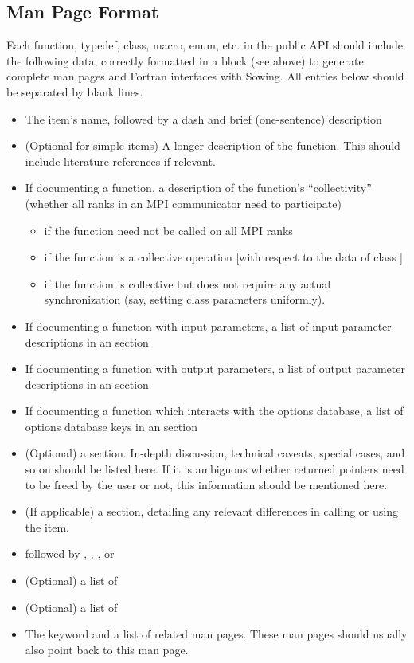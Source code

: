 \subsection{Man Page Format}
Each function, typedef, class, macro, enum, etc. in the public API should include the following data, correctly formatted in 
a block (see above) to generate complete man pages and Fortran interfaces with Sowing. 
All entries below should be separated by blank lines.
\begin{itemize}
  \item The item's name, followed by a dash and brief (one-sentence) description
  \item (Optional for simple items) A longer description of the function. This should include literature references if relevant.
  \item If documenting a function, a description of the function's ``collectivity'' (whether all ranks in an MPI communicator need to participate)
    \begin{itemize}
    \item {} if the function need not be called on all MPI ranks
    \item {} if the function is a collective operation [with respect to the data of class ]
    \item {} if the function is collective but does not require any actual synchronization (say, setting class parameters uniformly).
    \end{itemize}
  \item If documenting a function with input parameters, a list of input parameter descriptions in an  section
  \item If documenting a function with output parameters, a list of output parameter descriptions in an  section
  \item If documenting a function which interacts with the options database, a list of options database keys in an  section
  \item (Optional) a  section. In-depth discussion, technical caveats, special cases, and so on should be listed here. 
    If it is ambiguous whether returned pointers need to be freed by the user or not, this information should be mentioned here.
  \item (If applicable) a  section, detailing any relevant differences in calling or using the item.
  \item {} followed by , , , or 
  \item (Optional) a list of 
  \item (Optional) a list of 
  \item The  keyword and a list of related man pages. These man pages should usually also point back to this man page.
\end{itemize}

